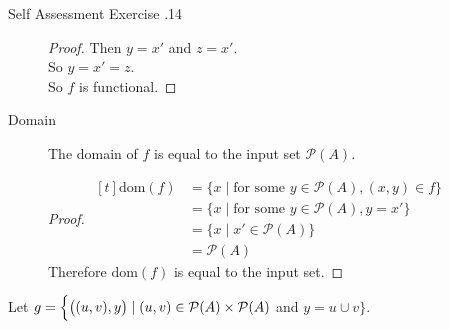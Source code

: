 \documentclass[\main/notes.tex]{subfiles}
\begin{document}
\begin{exercise}{Self Assessment Exercise \thechapter.14}
\begin{questions}
\begin{questions}
\begin{answer}
\begin{description}
\begin{proof}
													Then $y = x'$ and $z = x'$.\\
													So $y = x' = z$.\\
													So $f$ is functional.
												\end{proof}
											\item[Domain] The domain of $f$ is equal to the input set $\mathcal{P}(A)$.
												\begin{proof} $
													\begin{aligned}[t]
														\mathrm{dom}(f) &= \{x \mid \text{for some } y \in \mathcal{P}(A), (x, y) \in f\}\\
														&= \{x \mid \text{for some } y \in \mathcal{P}(A), y = x'\}\\
														&= \{x \mid x' \in \mathcal{P}(A)\}\\
														&= \mathcal{P}(A)
													\end{aligned} $\\
													Therefore $\mathrm{dom}(f)$ is equal to the input set.
												\end{proof}
										\end{description}
									\end{answer}
								\item Let $g = \Bigl\{\bigl((u, v), y\bigr) \mid (u, v) \in \mathcal{P}(A) \times \mathcal{P}(A)$ and $y = u \cup v\Bigr\}$.
									\begin{answer}
\end{answer}
\end{questions}
\end{questions}
\end{exercise}
\end{document}
